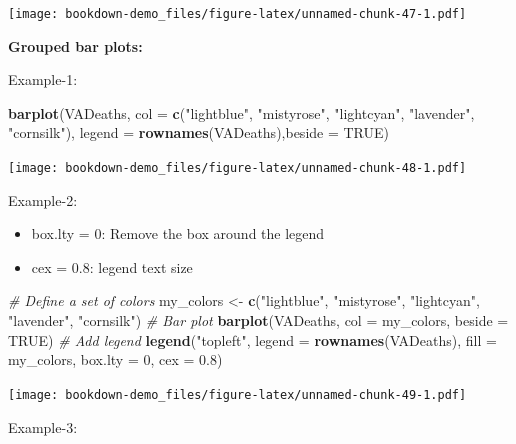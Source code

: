 \documentclass[]{book}
\newenvironment{Shaded}{\begin{snugshade}}{\end{snugshade}}
\newcommand{\KeywordTok}[1]{\textcolor[rgb]{0.13,0.29,0.53}{\textbf{#1}}}
\newcommand{\DataTypeTok}[1]{\textcolor[rgb]{0.13,0.29,0.53}{#1}}
\newcommand{\DecValTok}[1]{\textcolor[rgb]{0.00,0.00,0.81}{#1}}
\newcommand{\FloatTok}[1]{\textcolor[rgb]{0.00,0.00,0.81}{#1}}
\newcommand{\StringTok}[1]{\textcolor[rgb]{0.31,0.60,0.02}{#1}}
\newcommand{\CommentTok}[1]{\textcolor[rgb]{0.56,0.35,0.01}{\textit{#1}}}
\newcommand{\OtherTok}[1]{\textcolor[rgb]{0.56,0.35,0.01}{#1}}
\newcommand{\NormalTok}[1]{#1}
\begin{document}
\texttt{[image: bookdown-demo\_files/figure-latex/unnamed-chunk-47-1.pdf]}

\textbf{Grouped bar plots:}

Example-1:

\begin{Shaded}
\begin{Highlighting}[]
\KeywordTok{barplot}\NormalTok{(VADeaths,}
         \DataTypeTok{col =} \KeywordTok{c}\NormalTok{(}\StringTok{"lightblue"}\NormalTok{, }\StringTok{"mistyrose"}\NormalTok{, }\StringTok{"lightcyan"}\NormalTok{, }
                 \StringTok{"lavender"}\NormalTok{, }\StringTok{"cornsilk"}\NormalTok{),}
        \DataTypeTok{legend =} \KeywordTok{rownames}\NormalTok{(VADeaths),}\DataTypeTok{beside =} \OtherTok{TRUE}\NormalTok{)}
\end{Highlighting}
\end{Shaded}

\texttt{[image: bookdown-demo\_files/figure-latex/unnamed-chunk-48-1.pdf]}

Example-2:

\begin{itemize}
\item
  box.lty = 0: Remove the box around the legend
\item
  cex = 0.8: legend text size
\end{itemize}

\begin{Shaded}
\begin{Highlighting}[]
\CommentTok{# Define a set of colors}
\NormalTok{my_colors <-}\StringTok{ }\KeywordTok{c}\NormalTok{(}\StringTok{"lightblue"}\NormalTok{, }\StringTok{"mistyrose"}\NormalTok{, }\StringTok{"lightcyan"}\NormalTok{, }
                 \StringTok{"lavender"}\NormalTok{, }\StringTok{"cornsilk"}\NormalTok{)}
\CommentTok{# Bar plot}
\KeywordTok{barplot}\NormalTok{(VADeaths, }\DataTypeTok{col =}\NormalTok{ my_colors, }\DataTypeTok{beside =} \OtherTok{TRUE}\NormalTok{)}
\CommentTok{# Add legend}
\KeywordTok{legend}\NormalTok{(}\StringTok{"topleft"}\NormalTok{, }\DataTypeTok{legend =} \KeywordTok{rownames}\NormalTok{(VADeaths), }
       \DataTypeTok{fill =}\NormalTok{ my_colors, }\DataTypeTok{box.lty =} \DecValTok{0}\NormalTok{, }\DataTypeTok{cex =} \FloatTok{0.8}\NormalTok{)}
\end{Highlighting}
\end{Shaded}

\texttt{[image: bookdown-demo\_files/figure-latex/unnamed-chunk-49-1.pdf]}

Example-3:
\end{document}
